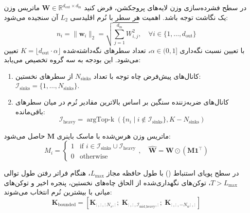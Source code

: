 در سطح فشرده‌سازی وزن لایه‌های پروجکشن، فرض کنید $\mathbf{W} \in \mathbb{R}^{d_{\text{out}} \times d_{\text{in}}}$ ماتریس وزن یک نگاشت توجه باشد. اهمیت هر سطر با نُرم اقلیدسی $L_2$ آن سنجیده می‌شود:
\begin{equation}
n_i = \|\mathbf{w}_i\|_2 = \sqrt{\sum_{j=1}^{d_{\text{in}}} W_{i, j}^2}, \quad \forall i \in \{1, \dots, d_{\text{out}}\}
\end{equation}
با تعیین نسبت نگه‌داری $\alpha \in (0, 1]$، تعداد سطرهای نگه‌داشته‌شده $K = \lfloor d_{\text{out}} \cdot \alpha \rfloor$ تعیین می‌شود. این بودجه به سه گروه تخصیص می‌یابد:
\begin{enumerate}
    \item کانال‌های پیش‌فرض چاه توجه با تعداد $N_{\text{sinks}}$ از سطرهای نخستین: $\mathcal{I}_{\text{sinks}} = \{1, \dots, N_{\text{sinks}}\}$.
    \item کانال‌های ضربه‌زننده سنگین بر اساس بالاترین مقادیر نُرم در میان سطرهای باقی‌مانده:
    \begin{equation}
    \mathcal{I}_{\text{heavy}} = \operatorname{argTop-k}\left(\{n_i \mid i \notin \mathcal{I}_{\text{sinks}}\}, K - N_{\text{sinks}}\right)
    \end{equation}
\end{enumerate}
ماتریس وزن هرس‌شده با ماسک باینری $\mathbf{M}$ حاصل می‌شود:
\begin{equation}
M_i = \begin{cases} 1 & \text{if } i \in \mathcal{I}_{\text{sinks}} \cup \mathcal{I}_{\text{heavy}} \\ 0 & \text{otherwise} \end{cases}, \quad \hat{\mathbf{W}} = \mathbf{W} \odot (\mathbf{M} \mathbf{1}^\top)
\end{equation}

در سطح پویای استنباط () با طول حافظه مجاز $L_{\text{max}}$، هنگام فراتر رفتن طول توالی $T > L_{\text{max}}$، توکن‌های نگهداری‌شده از الحاق چاه‌های نخستین، پنجره اخیر و توکن‌های میانی با بیشترین نُرم انتخاب می‌شوند:
\begin{equation}
\mathbf{K}_{\text{bounded}} = \left[\mathbf{K}_{:, :, :N_s, :}; \; \mathbf{K}_{:, :, \mathcal{I}_{\text{mid\_heavy}}, :}; \; \mathbf{K}_{:, :, -N_w:, :}\right]
\end{equation}

